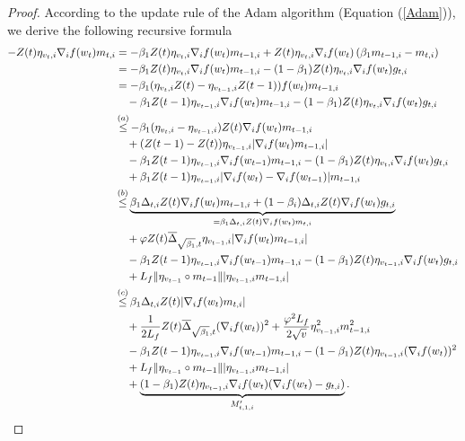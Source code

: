 \documentclass{article} %
\begin{document}
\begin{proof}
According to the update rule of the Adam algorithm (Equation (\ref{Adam})), we derive the following recursive formula
\begin{align*}
-Z(t)\eta_{v_{t},i}\nabla_{i}f(w_{t})m_{t,i}&=-\beta_{1}Z(t)\eta_{v_{t},i}\nabla_{i}f(w_{t})m_{t-1,i}+Z(t)\eta_{v_{t},i}\nabla_{i}f(w_{t})\left(\beta_{1}m_{t-1,i}-m_{t,i}\right)\\&=-\beta_{1}Z(t)\eta_{v_{t},i}\nabla_{i}f(w_{t})m_{t-1,i}-(1-\beta_{1})Z(t)\eta_{v_{t},i}\nabla_{i}f(w_{t})g_{t,i}\\&=-\beta_{1}(\eta_{v_{t},i}Z(t)-\eta_{v_{t-1},i}Z(t-1))f(w_{t})m_{t-1,i}\\&\quad -\beta_{1}Z(t-1)\eta_{v_{t-1},i}\nabla_{i}f(w_{t})m_{t-1,i}-(1-\beta_{1})Z(t)\eta_{v_{t},i}\nabla_{i}f(w_{t})g_{t,i} \\&\mathop{\le}^{(a)} -\beta_{1}(\eta_{v_{t},i}-\eta_{v_{t-1},i})Z(t)\nabla_{i}f(w_{t})m_{t-1,i}\\&\quad+(Z(t-1)-Z(t))\eta_{v_{t-1},i}|\nabla_{i}f(w_{t})m_{t-1,i}|\\&\quad-\beta_{1}Z(t-1)\eta_{v_{t-1},i}\nabla_{i}f(w_{t-1})m_{t-1,i}-(1-\beta_{1})Z(t)\eta_{v_{t},i}\nabla_{i}f(w_{t})g_{t,i}\\&\quad+\beta_{1}Z(t-1)\eta_{v_{t-1},i}|\nabla_{i}f(w_{t})-\nabla_{i}f(w_{t-1})|m_{t-1,i}\\&\mathop{\le}^{(b)} \underbrace{\beta_{1}\Delta_{t,i}Z(t)\nabla_{i}f(w_{t})m_{t-1,i}+(1-\beta_{i})\Delta_{t,i}Z(t)\nabla_{i}f(w_{t})g_{t,i}}_{=\beta_{1}\Delta_{t,i}Z(t)\nabla_{i}f(w_{t})m_{t,i}}\\&\quad+\varphi Z(t)\overline{\Delta}_{\sqrt{\beta_{1}},t}\eta_{v_{t-1},i}|\nabla_{i}f(w_{t})m_{t-1,i}|\\&\quad-\beta_{1}Z(t-1)\eta_{v_{t-1},i}\nabla_{i}f(w_{t-1})m_{t-1,i}-(1-\beta_{1})Z(t)\eta_{v_{t-1},i}\nabla_{i}f(w_{t})g_{t,i}\\&\quad+L_{f}\|\eta_{v_{t-1}}\circ m_{t-1}\||\eta_{v_{t-1},i}m_{t-1,i}|\\&\mathop{\le}^{(c)}\beta_{1}\Delta_{t,i}Z(t)|\nabla_{i}f(w_{t})m_{t,i}|\\&\quad+\frac{1}{2L_{f}}Z(t)\overline{\Delta}_{\sqrt{\beta_{1}},t}(\nabla_{i}f(w_{t})  )^{2}+\frac{\varphi^{2}L_{f}}{2\sqrt{v}}\eta_{v_{t-1},i}^{2}m_{t-1,i}^{2}\\&\quad-\beta_{1}Z(t-1)\eta_{v_{t-1},i}\nabla_{i}f(w_{t-1})m_{t-1,i}-(1-\beta_{1})Z(t)\eta_{v_{t-1},i}(\nabla_{i}f(w_{t}))^{2}\notag\\&\quad+L_{f}\|\eta_{v_{t-1}}\circ m_{t-1}\||\eta_{v_{t-1},i}m_{t-1,i}|\\&\quad+\underbrace{(1-\beta_{1})Z(t)\eta_{v_{t-1},i}\nabla_{i}f(w_{t})(\nabla_{i}f(w_{t})-g_{t,i})}_{M'_{t,1,i}}.%

\end{align*}
\end{proof}
\end{document}
